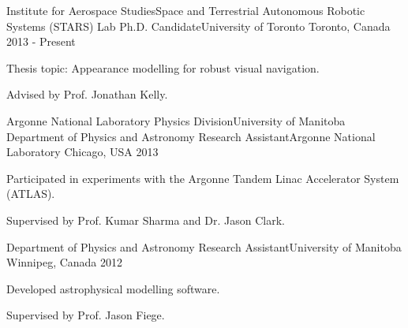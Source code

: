 

\begin{cventries}

  \cventry
    {Institute for Aerospace Studies{\enskip\cdotp\enskip}Space and Terrestrial Autonomous Robotic Systems (STARS) Lab} %
    {Ph.D. Candidate{\enskip\cdotp\enskip}University of Toronto} %
    {Toronto, Canada} %
    {2013 - Present} %
    {
      \begin{cvitems} %
        \item {Thesis topic: Appearance modelling for robust visual navigation.}
        \item {Advised by Prof. Jonathan Kelly.}
      \end{cvitems}
    }

  \cventry
    {Argonne National Laboratory Physics Division{\enskip\cdotp\enskip}University of Manitoba Department of Physics and Astronomy} %
    {Research Assistant{\enskip\cdotp\enskip}Argonne National Laboratory} %
    {Chicago, USA} %
    {2013} %
    {
      \begin{cvitems} %
        \item {Participated in experiments with the Argonne Tandem Linac Accelerator System (ATLAS).}
        \item {Supervised by Prof. Kumar Sharma and Dr. Jason Clark.}
      \end{cvitems}
    }
  
    \cventry
    {Department of Physics and Astronomy} %
    {Research Assistant{\enskip\cdotp\enskip}University of Manitoba} %
    {Winnipeg, Canada} %
    {2012} %
    {
      \begin{cvitems} %
        \item {Developed astrophysical modelling software.}
        \item {Supervised by Prof. Jason Fiege.}
      \end{cvitems}
    }

\end{cventries}
